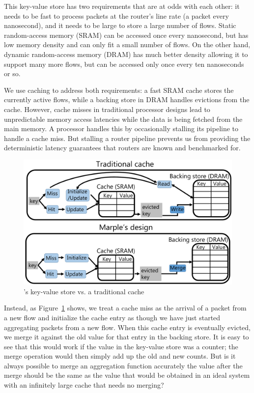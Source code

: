 This key-value store has two requirements that are at odds with each other: it
needs to be fast to process packets at the router's line rate (a packet every
nanosecond), and it needs to be large to store a large number of flows. Static
random-access memory (SRAM) can be accessed once every nanosecond, but has low
memory density and can only fit a small number of flows. On the other hand,
dynamic random-access memory (DRAM) has much better density allowing it to
support many more flows, but can be accessed only once every ten nanoseconds or
so.

We use caching to address both requirements: a fast SRAM cache stores the
currently active flows, while a backing store in DRAM handles evictions from
the cache. However, cache misses in traditional processor designs lead to
unpredictable memory access latencies while the data is being fetched from the
main memory. A processor handles this by occasionally stalling its pipeline to
handle a cache miss. But stalling a router pipeline prevents us from providing
the deterministic latency guarantees that routers are known and benchmarked
for.

\begin{figure}
\centering
\includegraphics[width=0.6\columnwidth]{pq_kv_store.pdf}
\caption{\TheSystem's key-value store vs. a traditional cache}
\label{fig:hw_diff}
\end{figure}

Instead, as Figure~\ref{fig:hw_diff} shows, we treat a cache miss as the
arrival of a packet from a new flow and initialize the cache entry as though we
have just started aggregating packets from a new flow. When this cache entry is
eventually evicted, we merge it against the old value for that entry in the
backing store. It is easy to see that this would work if the value in the
key-value store was a counter; the merge operation would then simply add up the
old and new counts.  But is it always possible to merge an aggregation function
accurately \ie the value after the merge should be the same as the value that
would be obtained in an ideal system with an infinitely large cache that needs
no merging?

